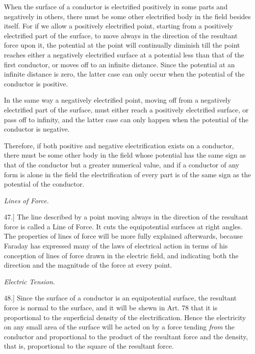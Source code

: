 \documentclass[11pt,a4paper]{article}
\begin{document}
When the surface of a conductor is electrified positively in some parts
and negatively in others, there must be some other electrified body in
the field besides itself. For if we allow a positively electrified
point, starting from a positively electrified part of the surface, to
move always in the direction of the resultant force upon it, the
potential at the point will continually diminish till the point reaches
either a negatively electrified surface at a potential less than that of
the first conductor, or moves off to an infinite distance. Since the
potential at an infinite distance is zero, the latter case can only
occur when the potential of the conductor is positive.

In the same way a negatively electrified point, moving off from a
negatively electrified part of the surface, must either reach a
positively electrified surface, or pass off to infinity, and the latter
case can only happen when the potential of the conductor is negative.

Therefore, if both positive and negative electrification exists on a
conductor, there must be some other body in the field whose potential
has the same sign as that of the conductor but a greater numerical
value, and if a conductor of any form is alone in the field the
electrification of every part is of the same sign as the potential of
the conductor.

\clearpage
\setcounter{footnote}{0}

\begin{center}
\textit{Lines of Force.}
\end{center}

47.] The line described by a point moving always in the direction of the
resultant force is called a Line of Force. It cuts the equipotential
surfaces at right angles. The properties of lines of force will be more
fully explained afterwards, because Faraday has expressed many of the
laws of electrical action in terms of his conception of lines of force
drawn in the electric field, and indicating both the direction and the
magnitude of the force at every point.

\begin{center}
\textit{Electric Tension.}
\end{center}

48.] Since the surface of a conductor is an equipotential surface, the
resultant force is normal to the surface, and it will be shewn in
Art. 78 that it is proportional to the superficial density of the
electrification. Hence the electricity on any small area of the surface
will be acted on by a force tending \textit{from} the conductor and
proportional to the product of the resultant force and the density, that
is, proportional to the square of the resultant force.
\end{document}
